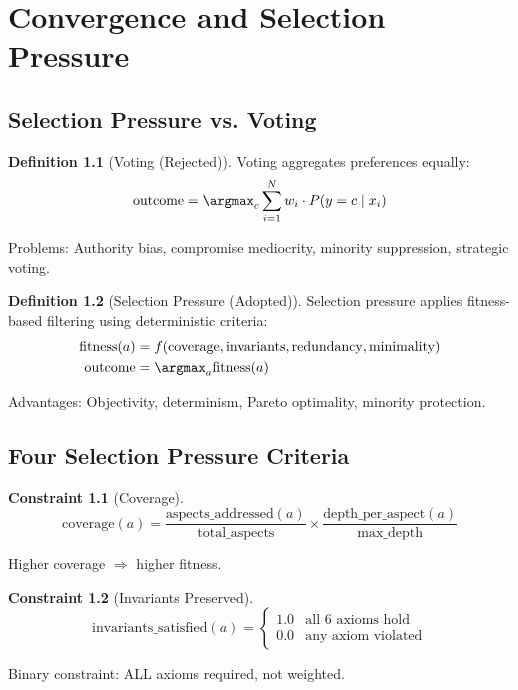 \documentclass[12pt,oneside,a4paper]{book}
\theoremstyle{definition}
\newtheorem{definition}{Definition}[chapter]
\newtheorem{constraint}{Constraint}[chapter]
\begin{document}
\chapter{Convergence and Selection Pressure}
\label{ch:convergence}


\section{Selection Pressure vs. Voting}
\label{sec:convergence-vs-voting}

\begin{definition}[Voting (Rejected)]
Voting aggregates preferences equally:
$$\text{outcome} = \argmax_c \sum_{i=1}^{N} w_i \cdot P(y=c \mid x_i)$$

Problems: Authority bias, compromise mediocrity, minority suppression, strategic voting.
\end{definition}

\begin{definition}[Selection Pressure (Adopted)]
Selection pressure applies fitness-based filtering using deterministic criteria:
\begin{align}
  \text{fitness}(a) &= f(\text{coverage}, \text{invariants}, \text{redundancy}, \text{minimality}) \\
  \text{outcome} &= \argmax_a \text{fitness}(a)
\end{align}

Advantages: Objectivity, determinism, Pareto optimality, minority protection.
\end{definition}

\section{Four Selection Pressure Criteria}
\label{sec:selection-criteria}

\begin{constraint}[Coverage]
$$\text{coverage}(a) = \frac{\text{aspects\_addressed}(a)}{\text{total\_aspects}} \times \frac{\text{depth\_per\_aspect}(a)}{\text{max\_depth}}$$

Higher coverage $\Rightarrow$ higher fitness.
\end{constraint}

\begin{constraint}[Invariants Preserved]
$$\text{invariants\_satisfied}(a) = \begin{cases} 1.0 & \text{all 6 axioms hold} \\ 0.0 & \text{any axiom violated} \end{cases}$$

Binary constraint: ALL axioms required, not weighted.
\end{constraint}
\end{document}
